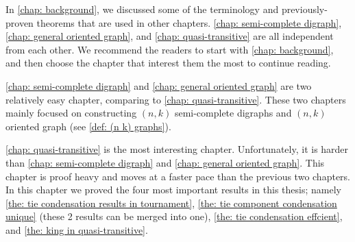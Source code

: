 In \cref{chap: background}, we discussed some of the terminology
and previously-proven theorems that are used in other chapters.
\cref{chap: semi-complete digraph}, \cref{chap: general oriented graph},
and \cref{chap: quasi-transitive} are all independent from each other.
We recommend the readers to start with \cref{chap: background},
and then choose the chapter that interest them
the most to continue reading.

\cref{chap: semi-complete digraph} and \cref{chap: general oriented graph}
are two relatively easy chapter, comparing to \cref{chap: quasi-transitive}.
These two chapters mainly focused on constructing
\((n, k)\) semi-complete digraphs and
\((n, k)\) oriented graph (see \cref{def: (n k) graphs}).

\cref{chap: quasi-transitive} is the most interesting chapter.
Unfortunately, it is harder than
\cref{chap: semi-complete digraph} and \cref{chap: general oriented graph}.
This chapter is proof heavy and
moves at a faster pace than the previous two chapters.
In this chapter we proved the four most important results
in this thesis; namely
\cref{the: tie condensation results in tournament},
\cref{the: tie component condensation unique}
(these 2 results can be merged into one),
\cref{the: tie condensation effcient},
and \cref{the: king in quasi-transitive}.

